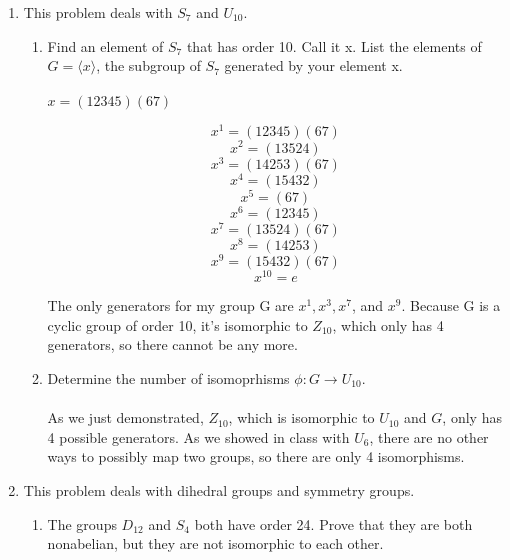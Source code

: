 
\usepackage{amsmath, dsfont}

\newenvironment{amatrix}[1]{%
  \left(\begin{array}{@{}*{#1}{c}|c@{}}
}{%
  \end{array}\right)
}

\makeatletter
\renewcommand*\env@matrix[1][*\c@MaxMatrixCols c]{%
  \hskip -\arraycolsep
  \let\@ifnextchar\new@ifnextchar
  \array{#1}}
\makeatother

\newcommand{\?}{\stackrel{?}{=}}



\pagestyle{myheadings}


\begin{enumerate}
\item This problem deals with $S_7$ and $U_{10}$.
  \begin{enumerate}
  \item Find an element of $S_7$ that has order 10. Call it x. List the elements of $G = \langle x \rangle$, the subgroup of $S_7$ generated by your element x.\\\\

  $x = (12345)(67)$
  
  $$x^1 = (12345)(67)$$
  $$x^2 = (13524)$$
  $$x^3 = (14253)(67)$$
  $$x^4 = (15432)$$
  $$x^5 = (67)$$
  $$x^6 = (12345)$$
  $$x^7 = (13524)(67)$$
  $$x^8 = (14253)$$
  $$x^9 = (15432)(67)$$
  $$x^{10} = e$$

  The only generators for my group G are $x^1, x^3, x^7$, and $x^9$. Because G is a cyclic group of order 10, it's isomorphic to $Z_{10}$, which only has 4 generators, so there cannot be any more.\\

  \item Determine the number of isomoprhisms $\phi : G \rightarrow U_{10}$.\\\\

  As we just demonstrated, $Z_{10}$, which is isomorphic to $U_{10}$ and $G$, only has 4 possible generators. As we showed in class with $U_6$, there are no other ways to possibly map two groups, so there are only 4 isomorphisms.
  \end{enumerate}

  \item This problem deals with dihedral groups and symmetry groups.

  \begin{enumerate}
  \item The groups $D_{12}$ and $S_4$ both have order 24. Prove that they are both nonabelian, but they are not isomorphic to each other.\\\\


\end{enumerate}
\end{enumerate}
